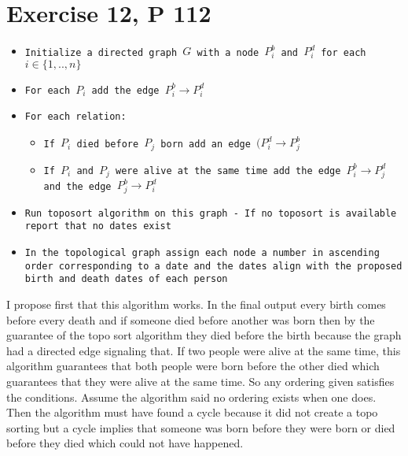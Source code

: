 \documentclass{amsart}
\begin{document}
\section{Exercise 12, P 112}

{\small
    \begin{itemize}
        \item \texttt{Initialize a directed graph $G$ with a node $P_i^{b}$ and $P_i^{d}$ for each $i \in \{1,..,n\}$}
        \item \texttt{For each $P_i$ add the edge $P_i^{b} \rightarrow P_i^{d}$ }
        \item \texttt{For each relation:}
            \begin{itemize}
                \item \texttt{If $P_i$ died before $P_j$ born add an edge $(P_i^{d} \rightarrow P_j^{b}$ }
                \item \texttt{If $P_i$ and $P_j$ were alive at the same time add the edge $P_i^{b} \rightarrow P_j^{d}$ 
                    and the edge $P_j^{b} \rightarrow P_i^{d}$}
            \end{itemize}
        \item \texttt{Run toposort algorithm on this graph - If no toposort is available report that no dates exist}
        \item \texttt{In the topological graph assign each node a number in ascending order corresponding to a date and the dates align with
            the proposed birth and death dates of each person}
    \end{itemize}
} 
I propose first that this algorithm works. In the final output every birth comes before every death and if someone died before another was born
then by the guarantee of the topo sort algorithm they died before the birth because the graph had a directed edge signaling that. If two people 
were alive at the same time, this algorithm guarantees that both people were born before the other died which guarantees that they were alive at the same time.
So any ordering given satisfies the conditions. Assume the algorithm said no ordering exists when one does. Then the algorithm must have found a cycle because
it did not create a topo sorting but a cycle implies that someone was born before they were born or died before they died which could not have happened.
\end{document}
